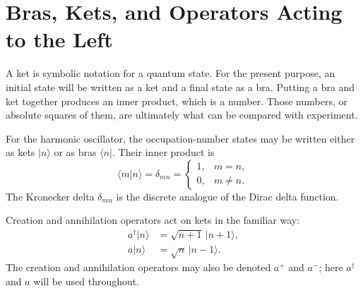 \section{Bras, Kets, and Operators Acting to the Left}

A ket is symbolic notation for a quantum state. For the present purpose, an initial state will be written as a ket and a final state as a bra. Putting a bra and ket together produces an inner product, which is a number. Those numbers, or absolute squares of them, are ultimately what can be compared with experiment.

\begin{classroomqa}
\end{classroomqa}

For the harmonic oscillator, the occupation-number states may be written either as kets \(\lvert n\rangle\) or as bras \(\langle n\rvert\). Their inner product is
\begin{equation}
\langle m\vert n\rangle=\delta_{mn}
=\begin{cases}
1,&m=n,\\
0,&m\neq n.
\end{cases}
\end{equation}
The Kronecker delta \(\delta_{mn}\) is the discrete analogue of the Dirac delta function.

Creation and annihilation operators act on kets in the familiar way:
\begin{align}
a^\dagger\lvert n\rangle&=\sqrt{n+1}\,\lvert n+1\rangle,\\
a\lvert n\rangle&=\sqrt n\,\lvert n-1\rangle.
\end{align}
The creation and annihilation operators may also be denoted \(a^+\) and \(a^-\); here \(a^\dagger\) and \(a\) will be used throughout.

